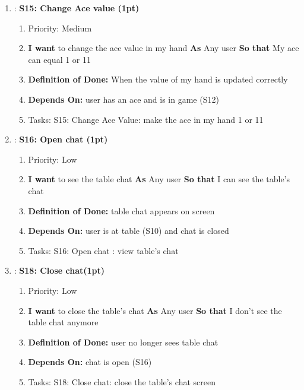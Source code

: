 \begin{enumerate}
    \item: \textbf{S15: Change Ace value (1pt)}
    \begin{enumerate}
        \item Priority: Medium
        \item \textbf{I want} to change the ace value in my hand \textbf{As} Any user \textbf{So that} My ace can equal 1 or 11
        \item \textbf{Definition of Done:} When the value of my hand is updated correctly
        \item \textbf{Depends On:} user has an ace and is in game (S12)
        \item Tasks: S15: Change Ace Value: make the ace in my hand 1 or 11
    \end{enumerate}

    \item: \textbf{S16: Open chat (1pt)}
    \begin{enumerate}
        \item Priority: Low
        \item \textbf{I want} to see the table chat \textbf{As} Any user \textbf{So that} I can see the table's chat 
        \item \textbf{Definition of Done:} table chat appears on screen
        \item \textbf{Depends On:} user is at table (S10) and chat is closed
        \item Tasks: S16: Open chat : view table's chat
    \end{enumerate}

    \item: \textbf{S18: Close chat(1pt)}
    \begin{enumerate}
        \item Priority: Low
        \item \textbf{I want} to close the table's chat \textbf{As} Any user \textbf{So that} I don't see the table chat anymore 
        \item \textbf{Definition of Done:} user no longer sees table chat
        \item \textbf{Depends On:} chat is open (S16)
        \item Tasks: S18: Close chat: close the table's chat screen
    \end{enumerate}  
\end{enumerate}



